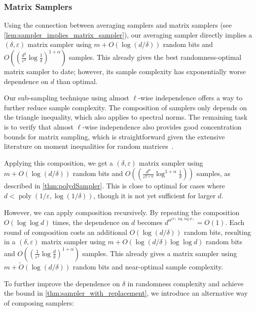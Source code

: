 \documentclass[10pt,a4paper]{article}
\DeclareMathOperator*{\poly}{poly}
\newcommand{\eps}{\varepsilon}
\newcommand{\1}{\mathbbm{1}}
\newcommand{\wt}{\widetilde}
\begin{document}
\subsubsection{Matrix Samplers}
Using the connection between averaging samplers and matrix samplers (see \cref{lem:sampler_implies_matrix_sampler}), our averaging sampler directly implies a $(\delta, \eps)$ matrix sampler using $m + O(\log(d / \delta))$ random bits and $O((\frac{d^2}{\eps^2} \log \frac{1}{\delta})^{1 + \alpha})$ samples. This already gives the best randomness-optimal matrix sampler to date; however, its sample complexity has exponentially worse dependence on $d$ than optimal. 

Our sub-sampling technique using almost $\ell$-wise independence offers a way to further reduce sample complexity.
The composition of samplers only depends on the triangle inequality, which also applies to spectral norms.
The remaining task is to verify that almost $\ell$-wise independence also provides good concentration bounds for matrix sampling, which is straightforward given the extensive literature on moment inequalities for random matrices~\cite{CGT12, LT13, Tro15}.






Applying this composition, we get a $(\delta, \eps)$ matrix sampler using $m + O(\log(d / \delta))$ random bits and $O((\frac{d^\alpha}{\eps^{2 + \alpha}} \log^{1 + \alpha} \frac{1}{\delta}))$ samples, as described in \cref{thm:polydSampler}. This is close to optimal for cases where $d < \poly(1 / \eps, \log(1 / \delta))$, though it is not yet sufficient for 
larger $d$.

However, we can apply composition recursively. By repeating the composition $O(\log\log d)$ times, the dependence on $d$ becomes $d^{\alpha^{O(\log\log d)}} = O(1)$. Each round of composition costs an additional $O(\log (d / \delta))$ random bits, resulting in a $(\delta, \eps)$ matrix sampler using $m + O(\log(d /\delta) \log \log d)$ random bits and $O((\frac{1}{\eps^2}\log\frac{d}{\delta})^{1 + \alpha})$ samples. This already gives a  matrix sampler using $m + \wt{O}(\log(d / \delta))$ random bits and near-optimal sample complexity.

To further improve the dependence on $\delta$ in randomness complexity and achieve the bound in \cref{thm:sampler_with_replacement}, we introduce an alternative way of composing samplers:
\end{document}
